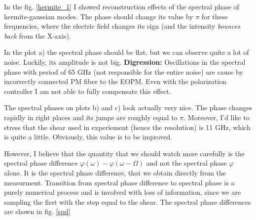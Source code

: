 \documentclass{article}
\begin{document}
In the fig. \ref{hermite_1} I showed reconstruction effects of the spectral phase of hermite-gaussian modes. The phase should change its value by $\pi$ for these frequencies, where the electric field changes its sign (and the intensity \emph{bounces back} from the X-axis).

In the plot a) the spectral phase should be flat, but we can observe quite a lot of noise. Luckily, its amplitude is not big. \textbf{Digression:} Oscillations in the spectral phase with period of 65 GHz (not responsible for the entire noise) are cause by incorrectly connected PM fiber to the EOPM. Even with the polarization controller I am not able to fully compensate this effect.

The spectral phases on plots b) and c) look actually very nice. The phase changes rapidly in right places and its jumps are roughly equal to $\pi$. Moreover, I'd like to stress that the shear used in experiement (hence the resolution) is 11 GHz, which is quite a little. Obviously, this value is to be improved.

However, I believe that the quantity that we should watch more carefully is the spectral phase difference $\varphi(\omega)-\varphi(\omega-\Omega)$ and not the spectral phase $\varphi$ alone. It is the spectral phase difference, that we obtain directly from the measurment. Transition from spectral phase difference to spectral phase is a purely numerical process and is involved with loss of information, since we are sampling the first with the step equal to the shear. The spectral phase differences are shown in fig. \ref{spd}
\end{document}

